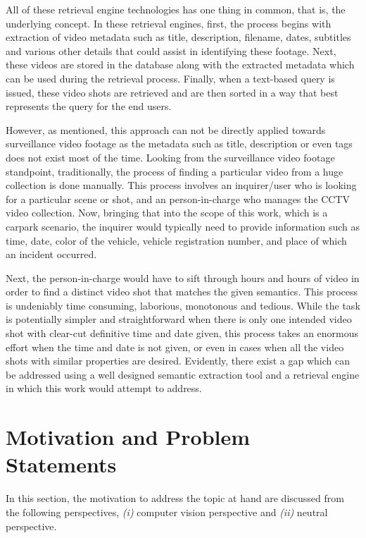 All of these retrieval engine technologies has one thing in common, that is, the underlying concept. In these retrieval engines, first, the process begins with extraction of video metadata such as title, description, filename, dates, subtitles and various other details that could assist in identifying these footage. Next, these videos are stored in the database along with the extracted metadata which can be used during the retrieval process. Finally, when a text-based query is issued, these video shots are retrieved and are then sorted in a way that best represents the query for the end users. 

However, as mentioned, this approach can not be directly applied towards surveillance video footage as the metadata such as title, description or even tags does not exist most of the time. Looking from the surveillance video footage standpoint, traditionally, the process of finding a particular video from a huge collection is done manually. This process involves an inquirer/user who is looking for a particular scene or shot, and an person-in-charge who manages the CCTV video collection. Now, bringing that into the scope of this work, which is a carpark scenario, the inquirer would typically need to provide information such as time, date, color of the vehicle, vehicle registration number, and place of which an incident occurred. %

Next, the person-in-charge would have to sift through hours and hours of video in order to find a distinct video shot that matches the given semantics. This process is undeniably time consuming, laborious, monotonous and tedious. While the task is potentially simpler and straightforward when there is only one intended video shot with clear-cut definitive time and date given, this process takes an enormous effort when the time and date is not given, or even in cases when all the video shots with similar properties are desired. Evidently, there exist a gap which can be addressed using a well designed semantic extraction tool and a retrieval engine in which this work would attempt to address.

\section{Motivation and Problem Statements}

In this section, the motivation to address the topic at hand are discussed from the following perspectives, \textit{(i)} computer vision perspective and \textit{(ii)} neutral perspective.

